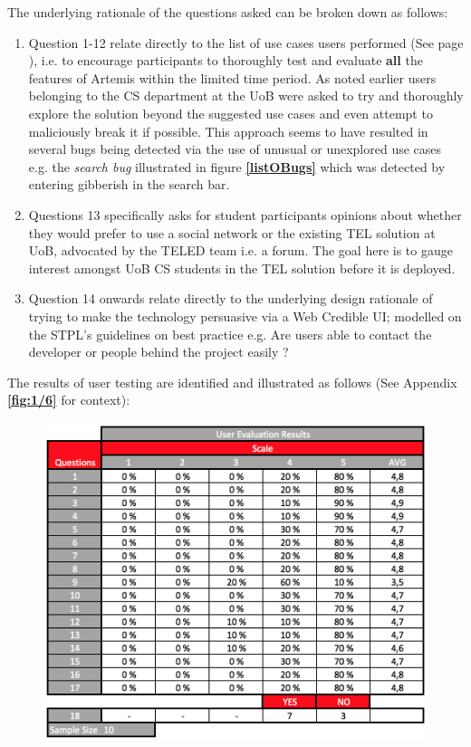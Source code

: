     The underlying rationale of the questions asked can be broken down as follows:
    \begin{enumerate}
        \item Question 1-12 relate directly to the list of use cases users performed (See page \pageref{fig:2/6}), i.e. to encourage participants to thoroughly test and evaluate \textbf{all} the features of Artemis within the limited time period. As noted earlier users belonging to the CS department at the UoB were asked to try and thoroughly explore the solution beyond the suggested use cases and even attempt to maliciously break it if possible. This approach seems to have resulted in several bugs being detected via the use of unusual or unexplored use cases e.g. the \textit{search bug} illustrated in figure \textbf{\ref{listOBugs}} which was detected by entering gibberish in the search bar.
        
        \item Questions 13 specifically asks for student participants opinions about whether they would prefer to use a social network or the existing TEL solution at UoB, advocated by the TELED team i.e. a forum. The goal here is to gauge interest amongst UoB CS students in the TEL solution before it is deployed.
        
        \item Question 14 onwards relate directly to the underlying design rationale of trying to make the technology persuasive via a Web Credible UI; modelled on the STPL's guidelines on best practice \cite{Fogg2002} e.g. Are users able to contact the developer or people behind the project easily ?
    \end{enumerate}

    The results of user testing are identified and illustrated as follows (See Appendix \textbf{\ref{fig:1/6}} for context):
    
    
    
    \begin{figure}[h]
    	\includegraphics[scale=0.66,center]{chapters/chapter04/figures/userEvaluationTable.png}
    \end{figure}
    
